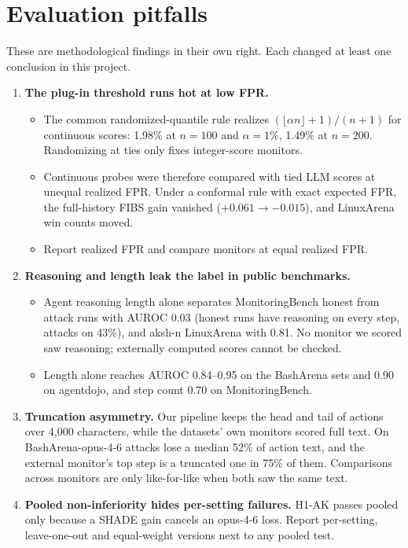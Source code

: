 \documentclass[11pt]{article}
\begin{document}
\section{Evaluation pitfalls}\label{sec:pitfalls}
These are methodological findings in their own right. Each changed at least one conclusion in this project.
\begin{enumerate}
\item \textbf{The plug-in threshold runs hot at low FPR.}
  \begin{itemize}
  \item The common randomized-quantile rule realizes $(\lfloor\alpha n\rfloor+1)/(n+1)$ for continuous scores: 1.98\% at $n=100$ and $\alpha=1\%$, 1.49\% at $n=200$. Randomizing at ties only fixes integer-score monitors.
  \item Continuous probes were therefore compared with tied LLM scores at unequal realized FPR. Under a conformal rule with exact expected FPR, the full-history FIBS gain vanished ($+0.061\to-0.015$), and LinuxArena win counts moved.
  \item Report realized FPR and compare monitors at equal realized FPR.
  \end{itemize}
\item \textbf{Reasoning and length leak the label in public benchmarks.}
  \begin{itemize}
  \item Agent reasoning length alone separates MonitoringBench honest from attack runs with AUROC 0.03 (honest runs have reasoning on every step, attacks on 43\%), and aksh-n LinuxArena with 0.81. No monitor we scored saw reasoning; externally computed scores cannot be checked.
  \item Length alone reaches AUROC 0.84--0.95 on the BashArena sets and 0.90 on agentdojo, and step count 0.70 on MonitoringBench.
  \end{itemize}
\item \textbf{Truncation asymmetry.} Our pipeline keeps the head and tail of actions over 4{,}000 characters, while the datasets' own monitors scored full text. On BashArena-opus-4-6 attacks lose a median 52\% of action text, and the external monitor's top step is a truncated one in 75\% of them. Comparisons across monitors are only like-for-like when both saw the same text.
\item \textbf{Pooled non-inferiority hides per-setting failures.} H1-AK passes pooled only because a SHADE gain cancels an opus-4-6 loss. Report per-setting, leave-one-out and equal-weight versions next to any pooled test.

\end{enumerate}
\end{document}
